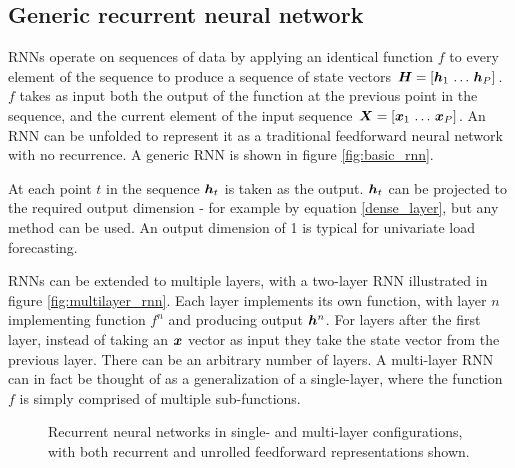 \subsection{Generic recurrent neural network}
RNNs operate on sequences of data by applying an identical function $f$ to every element of the sequence to produce a sequence of state vectors ${\bm{H}} = [{\bm{h}}_1 \, \ldots \, {\bm{h}}_P]$.
$f$ takes as input both the output of the function at the previous point in the sequence, and the current element of the input sequence ${\bm{X}} = [{\bm{x}}_1 \, \ldots \, {\bm{x}}_P]$.
An RNN can be unfolded to represent it as a traditional feedforward neural network with no recurrence.
A generic RNN is shown in figure \ref{fig:basic_rnn}.

At each point $t$ in the sequence ${\bm{h}}_t$ is taken as the output.
${\bm{h}}_t$ can be projected to the required output dimension - for example by equation \ref{dense_layer}, but any method can be used.
An output dimension of 1 is typical for univariate load forecasting.

RNNs can be extended to multiple layers, with a two-layer RNN illustrated in figure \ref{fig:multilayer_rnn}.
Each layer implements its own function, with layer $n$ implementing function $f^n$ and producing output ${\bm{h}}^n$.
For layers after the first layer, instead of taking an ${\bm{x}}$ vector as input they take the state vector from the previous layer.
There can be an arbitrary number of layers.
A multi-layer RNN can in fact be thought of as a generalization of a single-layer, where the function $f$ is simply comprised of multiple sub-functions.

\begin{figure}[htbp]
	\centering
	\quad\quad
	\caption{Recurrent neural networks in single- and multi-layer configurations, with both recurrent and unrolled feedforward representations shown. }
	\label{fig:rnn}
\end{figure}


